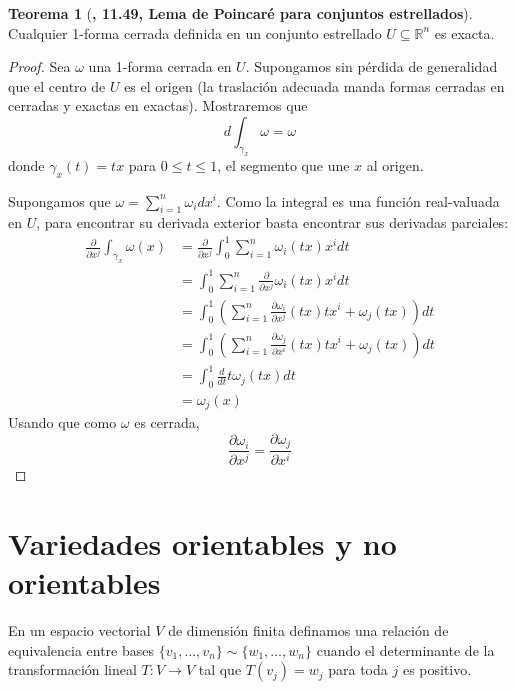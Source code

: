 \documentclass[spanish]{book}
\theoremstyle{definition}
\newtheorem*{teo}{Teorema}
\newcommand{\R}{\mathbb{R}}
\begin{document}
	\begin{teo}[\cite{Lee}\textbf{, 11.49, Lema de Poincaré para conjuntos estrellados}]
		Cualquier 1-forma cerrada definida en un conjunto estrellado $U\subseteq\R^n$ es exacta.
	\end{teo}
	\begin{proof}
		Sea $\omega$ una 1-forma cerrada en $U$. Supongamos sin pérdida de generalidad que el centro de $U$ es el origen (la traslación adecuada manda formas cerradas en cerradas y exactas en exactas). Mostraremos que
		\[d\int_{\gamma_x}\omega=\omega\]
		donde $\gamma_x(t)=tx$ para $0\leq t\leq1$, el segmento que une $x$ al origen.
		
		Supongamos que $\omega=\sum_{i=1}^n\omega_idx^i$. Como la integral es una función real-valuada en $U$, para encontrar su derivada exterior basta encontrar sus derivadas parciales:
		\begin{align*}
			\frac{\partial}{\partial x^j}\int_{\gamma_x}\omega(x)&=\frac{\partial}{\partial x^j}\int_0^1\sum_{i=1}^n\omega_i(tx)x^idt\\
			&=\int_0^1\sum_{i=1}^n\frac{\partial}{\partial x^j}\omega_i(tx)x^idt\\
			&=\int_0^1\left(\sum_{i=1}^n\frac{\partial \omega_i}{\partial x^j}(tx)tx^i+\omega_j(tx)\right)dt\\
			&=\int_0^1\left(\sum_{i=1}^n\frac{\partial \omega_j}{\partial x^i}(tx)tx^i+\omega_j(tx)\right)dt\\
			&=\int_0^1\frac{d}{dt}t\omega_{j}(tx)dt\\
			&=\omega_j(x)
		\end{align*}
		Usando que como $\omega$ es cerrada,
		\[\frac{\partial \omega_i}{\partial x^j}=\frac{\partial \omega_j}{\partial x^i}\]
	\end{proof}
	\section{Variedades orientables y no orientables}
	En un espacio vectorial $V$ de dimensión finita definamos una relación de equivalencia entre bases $\{v_1,\ldots,v_n\}\sim\{w_1,\ldots,w_n\}$ cuando el determinante de la transformación lineal $T:V\to V$ tal que $T(v_j)=w_j$ para toda $j$ es positivo.
	
\end{document}
